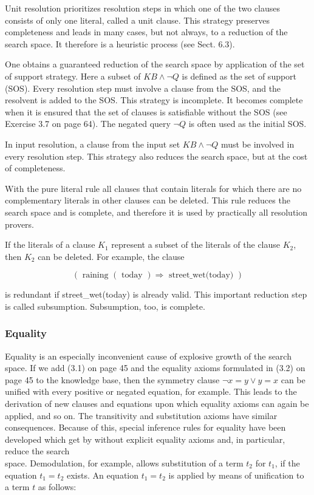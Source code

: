 \documentclass[10pt]{book}
\begin{document}
Unit resolution prioritizes resolution steps in which one of the two clauses consists of only one literal, called a unit clause. This strategy preserves completeness and leads in many cases, but not always, to a reduction of the search space. It therefore is a heuristic process (see Sect. 6.3).

One obtains a guaranteed reduction of the search space by application of the set of support strategy. Here a subset of $K B \wedge \neg Q$ is defined as the set of support (SOS). Every resolution step must involve a clause from the SOS, and the resolvent is added to the SOS. This strategy is incomplete. It becomes complete when it is ensured that the set of clauses is satisfiable without the SOS (see Exercise 3.7 on page 64). The negated query $\neg Q$ is often used as the initial SOS.

In input resolution, a clause from the input set $K B \wedge \neg Q$ must be involved in every resolution step. This strategy also reduces the search space, but at the cost of completeness.

With the pure literal rule all clauses that contain literals for which there are no complementary literals in other clauses can be deleted. This rule reduces the search space and is complete, and therefore it is used by practically all resolution provers.

If the literals of a clause $K_{1}$ represent a subset of the literals of the clause $K_{2}$, then $K_{2}$ can be deleted. For example, the clause

$$
(\text { raining }(\text { today }) \Rightarrow \text { street_wet(today) })
$$

is redundant if street\_wet(today) is already valid. This important reduction step is called subsumption. Subsumption, too, is complete.

\subsubsection*{Equality}
Equality is an especially inconvenient cause of explosive growth of the search space. If we add (3.1) on page 45 and the equality axioms formulated in (3.2) on page 45 to the knowledge base, then the symmetry clause $\neg x=y \vee y=x$ can be unified with every positive or negated equation, for example. This leads to the derivation of new clauses and equations upon which equality axioms can again be applied, and so on. The transitivity and substitution axioms have similar consequences. Because of this, special inference rules for equality have been developed which get by without explicit equality axioms and, in particular, reduce the search\\
space. Demodulation, for example, allows substitution of a term $t_{2}$ for $t_{1}$, if the equation $t_{1}=t_{2}$ exists. An equation $t_{1}=t_{2}$ is applied by means of unification to a term $t$ as follows:
\end{document}
